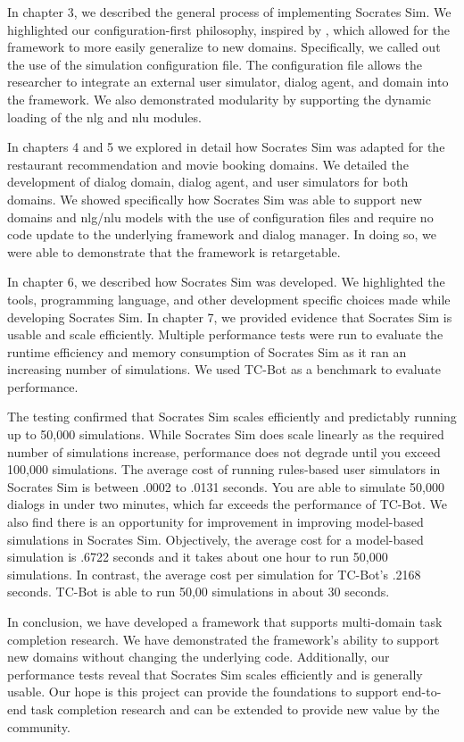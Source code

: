 In chapter 3, we described the general process of implementing Socrates Sim. We highlighted our configuration-first philosophy, inspired by \cite{Gardner_allennlp}, which allowed for the framework to more easily generalize to new domains. Specifically, we called out the use of the simulation configuration file. The configuration file allows the researcher to integrate an external user simulator, dialog agent, and domain into the framework. We also demonstrated modularity by supporting the dynamic loading of the nlg and nlu modules.

In chapters 4 and 5 we explored in detail how Socrates Sim was adapted for the restaurant recommendation and movie booking domains. We detailed the development of dialog domain, dialog agent, and user simulators for both domains. We showed specifically how Socrates Sim was able to support new domains and nlg/nlu models with the use of configuration files and require no code update to the underlying framework and dialog manager. In doing so, we were able to demonstrate that the framework is retargetable. 
  
In chapter 6, we described how Socrates Sim was developed. We highlighted the tools, programming language, and other development specific choices made while developing Socrates Sim. In chapter 7, we provided evidence that Socrates Sim is usable and scale efficiently. Multiple performance tests were run to evaluate the runtime efficiency and memory consumption of Socrates Sim as it ran an increasing number of simulations. We used TC-Bot \cite{li_end_to_end} as a benchmark to evaluate performance. 

The testing confirmed that Socrates Sim scales efficiently and predictably running up to 50,000 simulations. While Socrates Sim does scale linearly as the required number of simulations increase, performance does not degrade until you exceed 100,000 simulations. The average cost of running rules-based user simulators in Socrates Sim is between .0002 to .0131 seconds. You are able to simulate 50,000 dialogs in under two minutes, which far exceeds the performance of TC-Bot. We also find there is an opportunity for improvement in improving model-based simulations in Socrates Sim. Objectively, the average cost for a model-based simulation is .6722 seconds and it takes about one hour to run 50,000 simulations. In contrast, the average cost per simulation for TC-Bot's .2168 seconds. TC-Bot is able to run 50,00 simulations in about 30 seconds. 
 
In conclusion, we have developed a framework that supports multi-domain task completion research. We have demonstrated the framework's ability to support new domains without changing the underlying code. Additionally, our performance tests reveal that Socrates Sim scales efficiently and is generally usable. Our hope is this project can provide the foundations to support end-to-end task completion research and can be extended to provide new value by the community.

